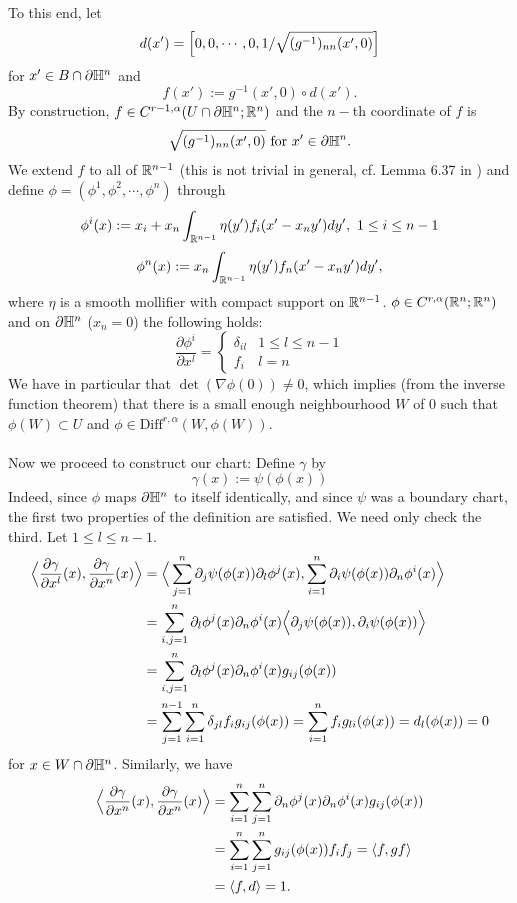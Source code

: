 {\\\\ To this end, let $$d(x')=\Big{[}0,0,\cdots,0,1/\sqrt{(g^{-1})_{nn}(x',0)}\Big{]}$$ for $x'\in B\cap \partial\mathbb{H}^n$ and $$f(x'):=g^{-1}(x',0) \circ d(x'). $$
By construction, $f\in C^{{r-1},\alpha}(U \cap \partial \mathbb{H}^n;\mathbb{R}^n)$ and the $n-$th coordinate of $f$ is $$\sqrt{(g^{-1})_{nn}(x',0)} \text{ for }x'\in \partial \mathbb{H}^n.$$
We extend $f$ to all of $\mathbb{R}^{n-1}$ (this is not trivial in general, cf. Lemma 6.37 in \cite{GilbargTrudinger2001})
and define $\phi=(\phi^1,\phi^2,\cdots,\phi^n)$ through $$\phi^i(x):=x_i + x_n \int_{\mathbb{R}^{n-1}} \eta(y')f_i(x'-x_ny')dy', \ 1\leq i\leq n-1$$
$$\phi^n(x):=x_n\int_{\mathbb{R}^{n-1}}\eta(y')f_n(x'-x_n y')dy', $$
where $\eta$ is a smooth mollifier with compact support on $\mathbb{R}^{n-1}$. $\phi\in C^{r,\alpha}(\mathbb{R}^n;\mathbb{R}^n)$ and on $\partial \mathbb{H}^n$ ($x_n=0$) the following holds: $$\frac{\partial \phi^i}{\partial x^l}=\begin{cases}
    \delta_{il} & 1\leq l\leq n-1 \\
    f_i & l=n
\end{cases} $$
We have in particular that $\det (\nabla \phi(0))\neq 0$, which implies (from the inverse function theorem) that there is a small enough neighbourhood $W$ of $0$ such that $\phi(W)\subset U$ and $\phi\in \mathrm{Diff}^{r,\alpha}(W,\phi(W))$. 
\\\\ Now we proceed to construct our chart: Define $\gamma$ by $$\gamma(x):=\psi(\phi(x)) $$
Indeed, since $\phi$ maps $\partial \mathbb{H}^n$ to itself identically, and since $\psi$ was a boundary chart, the first two properties of the definition are satisfied. We need only check the third.
Let $1\leq l\leq n-1$. \begin{align*}\Big{\langle} \frac{\partial \gamma}{\partial x^l}(x),\frac{\partial \gamma}{\partial x^n}(x)\Big{\rangle}&=\Big{\langle} \sum_{j=1}^n \partial_j \psi (\phi(x))\partial_l \phi^j(x), \sum_{i=1}^n \partial_i \psi (\phi(x))\partial_n \phi^i(x) \Big{\rangle} \\ 
&= \sum_{i,j=1}^n \partial_l \phi^j(x)\partial_n \phi^i(x)\Big{\langle} \partial_j \psi(\phi(x)),\partial_i \psi(\phi(x)) \Big{\rangle}
\\ & = \sum_{i,j=1}^n \partial_l \phi^j(x)\partial_n\phi^i(x) g_{ij}(\phi(x))
\\ &= \sum_{j=1}^{n-1}\sum_{i=1}^{n} \delta_{jl}f_i g_{ij}(\phi(x))=\sum_{i=1}^n f_i g_{li}(\phi(x))=d_l(\phi(x))=0
\end{align*}
for $x\in W\cap \partial \mathbb{H}^n$. Similarly, we have \begin{align*}
    \Big{\langle}\frac{\partial \gamma}{\partial x^n}(x),\frac{\partial \gamma}{\partial x^n}(x)\Big{\rangle} &= \sum_{i=1}^n\sum_{j=1}^n \partial_n\phi^j(x)\partial_n\phi^i(x)g_{ij}(\phi(x))
    \\ &= \sum_{i=1}^n\sum_{j=1}^n g_{ij}(\phi(x))f_i f_j = \langle f,gf\rangle \\ &= \langle f,d \rangle= 1.
\end{align*}}

